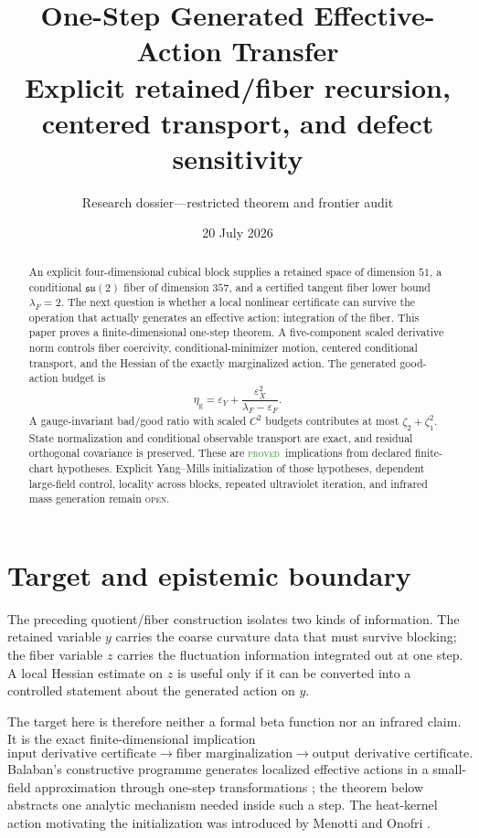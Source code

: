 \documentclass[11pt]{article}
\title{One-Step Generated Effective-Action Transfer\\
\large Explicit retained/fiber recursion, centered transport, and defect sensitivity}
\author{Research dossier---restricted theorem and frontier audit}
\date{20 July 2026}
\theoremstyle{definition}
\newcommand{\good}{\mathrm g}
\newcommand{\statusproved}{\textcolor{ForestGreen}{\textsc{proved}}}
\newcommand{\statusopen}{\textcolor{BrickRed}{\textsc{open}}}
\begin{document}
\maketitle

\begin{abstract}
An explicit four-dimensional cubical block supplies a retained space of
dimension $51$, a conditional $\mathfrak{su}(2)$ fiber of dimension $357$, and
a certified tangent fiber lower bound $\lambda_F=2$.  The next question is
whether a local nonlinear certificate can survive the operation that actually
generates an effective action: integration of the fiber.  This paper proves a
finite-dimensional one-step theorem.  A five-component scaled derivative norm
controls fiber coercivity, conditional-minimizer motion, centered conditional
transport, and the Hessian of the exactly marginalized action.  The generated
good-action budget is
\[
 \eta_{\good}=\varepsilon_Y+
 \frac{\varepsilon_X^2}{\lambda_F-\varepsilon_F}.
\]
A gauge-invariant bad/good ratio with scaled $C^2$ budgets contributes at most
$\zeta_2+\zeta_1^2$.  State normalization and conditional observable transport
are exact, and residual orthogonal covariance is preserved.  These are
\statusproved\ implications from declared finite-chart hypotheses.  Explicit
Yang--Mills initialization of those hypotheses, dependent large-field control,
locality across blocks, repeated ultraviolet iteration, and infrared mass
generation remain \statusopen.
\end{abstract}

\tableofcontents

\section{Target and epistemic boundary}

The preceding quotient/fiber construction isolates two kinds of information.
The retained variable $y$ carries the coarse curvature data that must survive
blocking; the fiber variable $z$ carries the fluctuation information integrated
out at one step.  A local Hessian estimate on $z$ is useful only if it can be
converted into a controlled statement about the generated action on $y$.

The target here is therefore neither a formal beta function nor an infrared
claim.  It is the exact finite-dimensional implication
\[
 \text{input derivative certificate}
 \longrightarrow
 \text{fiber marginalization}
 \longrightarrow
 \text{output derivative certificate}.
\]
Balaban's constructive programme generates localized effective actions in a
small-field approximation through one-step transformations
\cite{Balaban1987}; the theorem below abstracts one analytic mechanism needed
inside such a step.  The heat-kernel action motivating the initialization was
introduced by Menotti and Onofri \cite{MenottiOnofri}.
\end{document}
